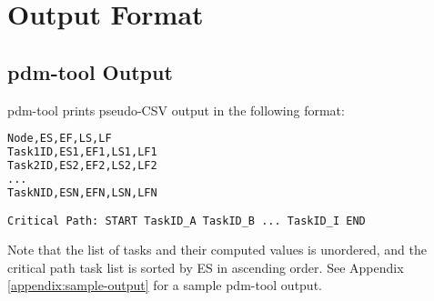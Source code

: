 \chapter{Output Format}

\section{pdm-tool Output}

pdm-tool prints pseudo-CSV output in the following format:

\begin{lstlisting}[language=python,frame=single,showstringspaces=false]
Node,ES,EF,LS,LF
Task1ID,ES1,EF1,LS1,LF1
Task2ID,ES2,EF2,LS2,LF2
...
TaskNID,ESN,EFN,LSN,LFN

Critical Path: START TaskID_A TaskID_B ... TaskID_I END
\end{lstlisting}

Note that the list of tasks and their computed values is unordered, and the
critical path task list is sorted by ES in ascending order.
See Appendix \ref{appendix:sample-output} for a sample pdm-tool output.
